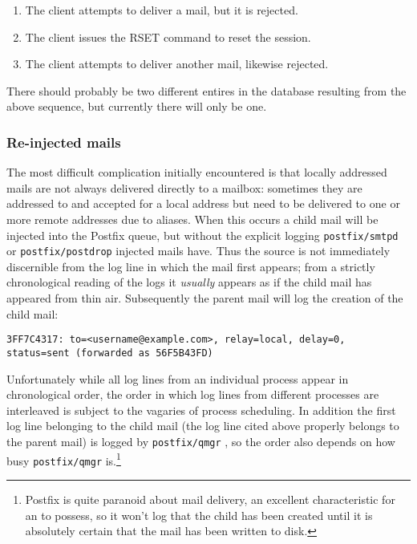 \documentclass[a4paper,12pt,draft]{article}
\newcommand{\daemon}[1]{%
    \texttt{postfix/#1}%
}
\begin{document}
\begin{enumerate}

    \item The client attempts to deliver a mail, but it is rejected.

    \item The client issues the RSET command to reset the session.

    \item The client attempts to deliver another mail, likewise rejected.

\end{enumerate}

There should probably be two different entires in the database resulting
from the above sequence, but currently there will only be one.



\subsubsection{Re-injected mails}

The most difficult complication initially encountered is that locally
addressed mails are not always delivered directly to a mailbox: sometimes
they are addressed to and accepted for a local address but need to be
delivered to one or more remote addresses due to aliases.  When this occurs
a child mail will be injected into the Postfix queue, but without the
explicit logging \daemon{smtpd} or \daemon{postdrop} injected mails have.
Thus the source is not immediately discernible from the log line in which
the mail first appears; from a strictly chronological reading of the logs
it \textit{usually\/} appears as if the child mail has appeared from thin
air.  Subsequently the parent mail will log the creation of the child mail:

\texttt{3FF7C4317: to=<username@example.com>, relay=local, \newline
delay=0, status=sent (forwarded as 56F5B43FD)}

Unfortunately while all log lines from an individual process appear in
chronological order, the order in which log lines from different processes
are interleaved is subject to the vagaries of process scheduling.  In
addition the first log line belonging to the child mail (the log line cited
above properly belongs to the parent mail) is logged by \daemon{qmgr}, so
the order also depends on how busy \daemon{qmgr} is.\footnote{Postfix is
quite paranoid about mail delivery, an excellent characteristic for an
\MTA{} to possess, so it won't log that the child has been created until it
is absolutely certain that the mail has been written to disk.}
\end{document}
